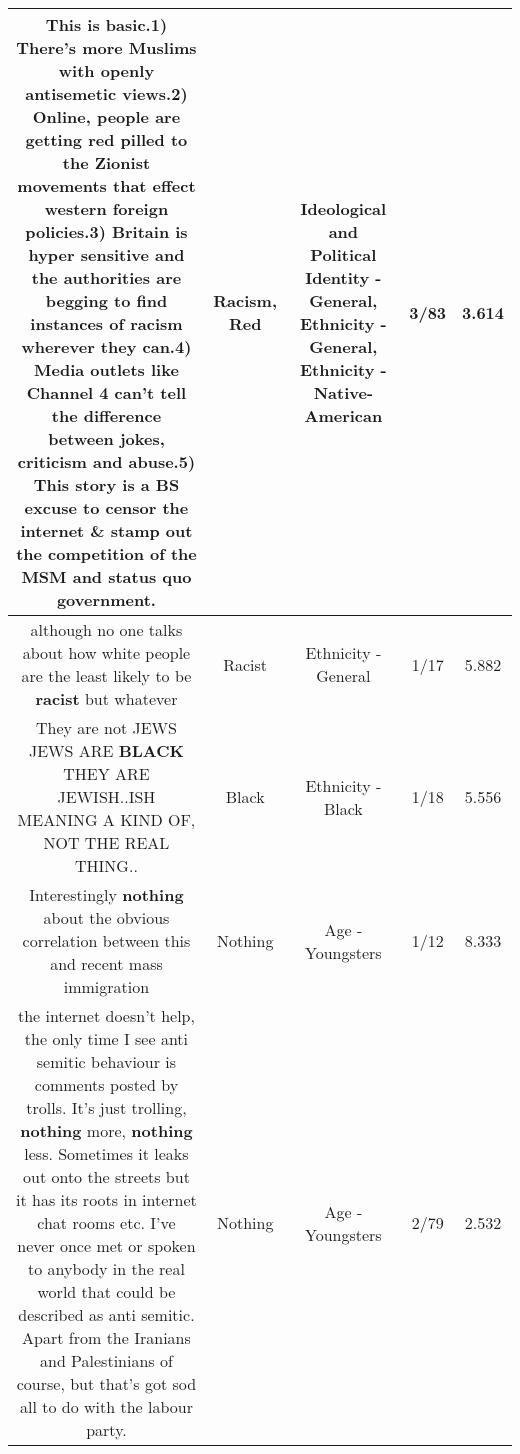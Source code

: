 \documentclass[11pt]{article}
\newlength\mylength
\begin{document}
\begin{center}
\begin{longtable}{|C{.65\mylength}|C{.30\mylength}|C{.12\mylength}|C{.12\mylength}|C{.12\mylength}|}
  \small This is basic.1) There's more Muslims with openly antisemetic views.2) Online, people are getting \textbf{r\textbf{ed}} pilled to the Zionist movements that effect western foreign policies.3) Britain is hyper sensitive and the authorities are begging to find instances of \textbf{racism} wherever they can.4) Media outlets like Channel 4 can't tell the difference between jokes, criticism and abuse.5) This story is a BS excuse to censor the internet \& stamp out the competition of the MSM and status quo government.\normalsize   & Racism, Red &  Ideological and Political Identity - General, Ethnicity - General, Ethnicity - Native-American & 3/83 & 3.614 \\  \hline
  \small although no one talks about how white people are the least likely to be \textbf{racist} but whatever\normalsize   & Racist & Ethnicity - General & 1/17 & 5.882 \\  \hline
  \small They are not JEWS JEWS ARE \textbf{BLACK} THEY ARE JEWISH..ISH MEANING A KIND OF, NOT THE REAL THING..\normalsize   & Black & Ethnicity - Black & 1/18 & 5.556 \\  \hline
  \small Interestingly \textbf{nothing} about the obvious correlation between this and recent mass immigration\normalsize   & Nothing & Age - Youngsters & 1/12 & 8.333 \\  \hline
  \small the internet doesn't help, the only time I see anti semitic behaviour is comments posted by trolls. It's just trolling, \textbf{nothing} more, \textbf{nothing} less. Sometimes it leaks out onto the streets but it has its roots in internet chat rooms etc. I've never once met or spoken to anybody in the real world that could be described as anti semitic. Apart from the Iranians and Palestinians of course, but that's got sod all to do with the labour party.\normalsize   & Nothing & Age - Youngsters & 2/79 & 2.532 \\  \hline

\end{longtable}
\end{center}
\end{document}
